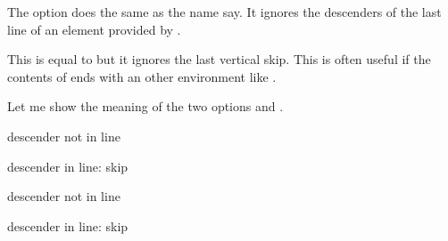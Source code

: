 \documentclass[openany,12pt,tocdepth=3]{ltx-md}
\begin{document}
The option  does the same as
the name say. It ignores the descenders of the last
line of an element provided by .

This is equal to  but it ignores the
last vertical skip. This is often useful if the contents
of  ends with an other environment
like . 


\clearpage
{}
Let me show the meaning of the two options 
and .


\begin{center}
\captionsetup{format=plain}
\noindent\begin{minipage}[t]{0.5\linewidth}
\begin{ltxexample}[caption={Example\newline \Opt{ignore-last-descender}\Opt{=true}},result=true,xframed={margin=5pt}]
\begin{xframed}
  descender not in line
\end{xframed}
\begin{xframed}
  descender in line: skip
\end{xframed}
\end{ltxexample}
\end{minipage}%
\begin{minipage}[t]{0.5\linewidth}
\begin{ltxexample}[caption={Example \newline\Opt{ignore-last-descender}\Opt{=false}},result=true,xframed={margin=5pt}]
\begin{xframed}
  descender not in line
\end{xframed}
\begin{xframed}
  descender in line: skip
\end{xframed}
\end{ltxexample}
\end{minipage}
\end{center}
\end{document}
